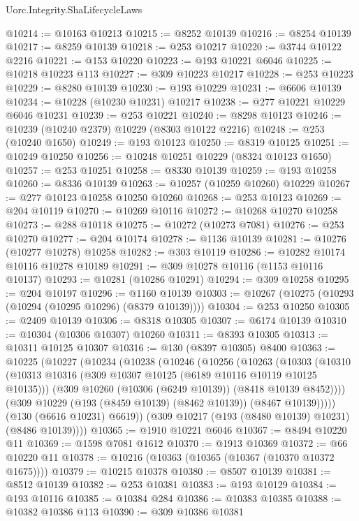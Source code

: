 \begin{lexlean}{Uorc.Integrity.ShaLifecycleLaws}
\begin{coremodule}
@10214 := @10163 @10213
@10215 := @8252 @10139
@10216 := @8254 @10139
@10217 := @8259 @10139
@10218 := @253 @10217
@10220 := @3744 @10122 @2216
@10221 := @153 @10220
@10223 := @193 @10221 @6046
@10225 := @10218 @10223 @113
@10227 := @309 @10223 @10217
@10228 := @253 @10223
@10229 := @8280 @10139
@10230 := @193 @10229
@10231 := @6606 @10139
@10234 := @10228 (@10230 @10231) @10217
@10238 := @277 @10221 @10229 @6046 @10231
@10239 := @253 @10221
@10240 := @8298 @10123
@10246 := @10239 (@10240 @2379) @10229 (@8303 @10122 @2216)
@10248 := @253 (@10240 @1650)
@10249 := @193 @10123
@10250 := @8319 @10125
@10251 := @10249 @10250
@10256 := @10248 @10251 @10229 (@8324 @10123 @1650)
@10257 := @253 @10251
@10258 := @8330 @10139
@10259 := @193 @10258
@10260 := @8336 @10139
@10263 := @10257 (@10259 @10260) @10229
@10267 := @277 @10123 @10258 @10250 @10260
@10268 := @253 @10123
@10269 := @204 @10119
@10270 := @10269 @10116
@10272 := @10268 @10270 @10258
@10273 := @288 @10118
@10275 := @10272 (@10273 @7081)
@10276 := @253 @10270
@10277 := @204 @10174
@10278 := @1136 @10139
@10281 := @10276 (@10277 @10278) @10258
@10282 := @303 @10119
@10286 := @10282 @10174 @10116 @10278 @10189
@10291 := @309 @10278 @10116 (@1153 @10116 @10137)
@10293 := @10281 (@10286 @10291)
@10294 := @309 @10258
@10295 := @204 @10197
@10296 := @1160 @10139
@10303 := @10267 (@10275 (@10293 (@10294 (@10295 @10296) (@8379 @10139))))
@10304 := @253 @10250
@10305 := @2409 @10139
@10306 := @8318 @10305
@10307 := @6174 @10139
@10310 := @10304 (@10306 @10307) @10260
@10311 := @8393 @10305
@10313 := @10311 @10125 @10307
@10316 := @130 (@8397 @10305) @8400
@10363 := @10225
    (@10227
      (@10234
        (@10238
          (@10246
            (@10256
              (@10263
                (@10303
                  (@10310
                    (@10313 @10316 (@309 @10307 @10125 (@6189 @10116 @10119 @10125 @10135)))
                    (@309 @10260 (@10306 (@6249 @10139)) (@8418 @10139 @8452))))
                (@309 @10229 (@193 (@8459 @10139) (@8462 @10139)) (@8467 @10139)))))
          (@130 (@6616 @10231) @6619))
        (@309 @10217 (@193 (@8480 @10139) @10231) (@8486 @10139))))
@10365 := @1910 @10221 @6046
@10367 := @8494 @10220 @11
@10369 := @1598 @7081 @1612
@10370 := @1913 @10369
@10372 := @66 @10220 @11
@10378 := @10216 (@10363 (@10365 (@10367 (@10370 @10372 @1675))))
@10379 := @10215 @10378
@10380 := @8507 @10139
@10381 := @8512 @10139
@10382 := @253 @10381
@10383 := @193 @10129
@10384 := @193 @10116
@10385 := @10384 @284
@10386 := @10383 @10385
@10388 := @10382 @10386 @113
@10390 := @309 @10386 @10381

\end{coremodule}
\end{lexlean}
